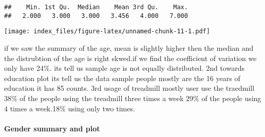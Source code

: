 \documentclass[
]{article}
\newenvironment{Shaded}{\begin{snugshade}}{\end{snugshade}}
\newcommand{\CommentTok}[1]{\textcolor[rgb]{0.56,0.35,0.01}{\textit{#1}}}
\newcommand{\DataTypeTok}[1]{\textcolor[rgb]{0.13,0.29,0.53}{#1}}
\newcommand{\DecValTok}[1]{\textcolor[rgb]{0.00,0.00,0.81}{#1}}
\newcommand{\FloatTok}[1]{\textcolor[rgb]{0.00,0.00,0.81}{#1}}
\newcommand{\KeywordTok}[1]{\textcolor[rgb]{0.13,0.29,0.53}{\textbf{#1}}}
\newcommand{\NormalTok}[1]{#1}
\newcommand{\OperatorTok}[1]{\textcolor[rgb]{0.81,0.36,0.00}{\textbf{#1}}}
\newcommand{\StringTok}[1]{\textcolor[rgb]{0.31,0.60,0.02}{#1}}
\begin{document}
\begin{verbatim}
##    Min. 1st Qu.  Median    Mean 3rd Qu.    Max. 
##   2.000   3.000   3.000   3.456   4.000   7.000
\end{verbatim}

\begin{Shaded}
\end{Shaded}

\texttt{[image: index\_files/figure-latex/unnamed-chunk-11-1.pdf]}

if we saw the summary of the age, mean is slightly higher then the
median and the distrubtion of the age is right skwed.if we find the
coefficient of variation we only have 24\%. its tell us sample age is
not equally distributed. 2nd towards education plot its tell us the data
sample people mostly are the 16 years of education it has 85 counts. 3rd
usage of treadmill mostly user use the traedmill 38\% of the people
using the treadmill three times a week 29\% of the people using 4 times
a week.18\% using only two times.

\hypertarget{gender-summary-and-plot}{%
\paragraph{Gender summary and plot}\label{gender-summary-and-plot}}

\begin{Shaded}
\end{Shaded}
\end{document}
